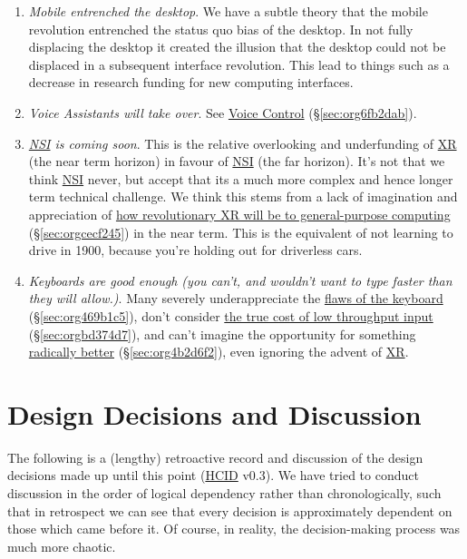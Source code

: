 \documentclass[logo,bsc,singlespacing,parskip]{infthesis}
\begin{document}
\begin{enumerate}
\item \emph{Mobile entrenched the desktop}.
We have a subtle theory that the mobile revolution entrenched the status quo bias of the desktop.
In not fully displacing the desktop it created the illusion that the desktop could not be displaced in a subsequent interface revolution.
This lead to things such as a decrease in research funding for new computing interfaces.

\item \emph{Voice Assistants will take over}.
See \hyperref[sec:org6fb2dab]{Voice Control} (\S \ref{sec:org6fb2dab}).

\item \emph{\hyperref[orgbcfe20a]{NSI} is coming soon}.
This is the relative overlooking and underfunding of \hyperref[org53dbe83]{XR} (the near term horizon) in favour of \hyperref[orgbcfe20a]{NSI} (the far horizon).
It's not that we think \hyperref[orgbcfe20a]{NSI} never, but accept that its a much more complex and hence longer term technical challenge.
We think this stems from a lack of imagination and appreciation of \hyperref[sec:orgcecf245]{how revolutionary XR will be to general-purpose computing} (\S \ref{sec:orgcecf245}) in the near term.
This is the equivalent of not learning to drive in 1900, because you're holding out for driverless cars.

\item \emph{Keyboards are good enough (you can't, and wouldn't want to type faster than they will allow.)}.
Many severely underappreciate the \hyperref[sec:org469b1c5]{flaws of the keyboard} (\S \ref{sec:org469b1c5}), don't consider \hyperref[sec:orgbd374d7]{the true cost of low throughput input} (\S \ref{sec:orgbd374d7}), and can't imagine the opportunity for something \hyperref[sec:org4b2d6f2]{radically better} (\S \ref{sec:org4b2d6f2}), even ignoring the advent of \hyperref[org53dbe83]{XR}.
\end{enumerate}

\chapter{Design Decisions and Discussion}
\label{sec:org8371976}
The following is a (lengthy) retroactive record and discussion of the design decisions made up until this point (\hyperref[org917851e]{HCID} v0.3).
We have tried to conduct discussion in the order of logical dependency rather than chronologically, such that in retrospect we can see that every decision is approximately dependent on those which came before it.
Of course, in reality, the decision-making process was much more chaotic. \\
\end{document}
